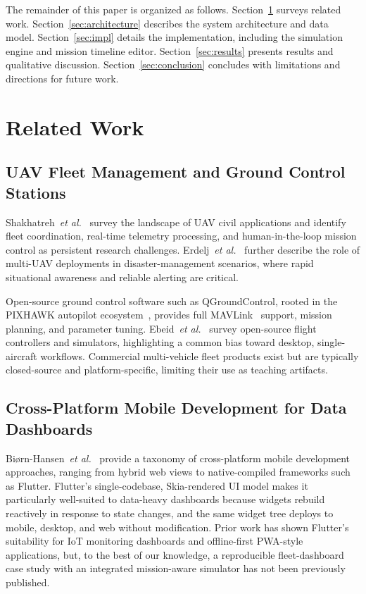 \documentclass[conference]{IEEEtran}
\begin{document}
The remainder of this paper is organized as follows. Section~\ref{sec:related} surveys related work. Section~\ref{sec:architecture} describes the system architecture and data model. Section~\ref{sec:impl} details the implementation, including the simulation engine and mission timeline editor. Section~\ref{sec:results} presents results and qualitative discussion. Section~\ref{sec:conclusion} concludes with limitations and directions for future work.

\section{Related Work}
\label{sec:related}

\subsection{UAV Fleet Management and Ground Control Stations}

Shakhatreh~\emph{et al.}~\cite{shakhatreh2019uav} survey the landscape of UAV civil applications and identify fleet coordination, real-time telemetry processing, and human-in-the-loop mission control as persistent research challenges. Erdelj~\emph{et al.}~\cite{erdelj2017help} further describe the role of multi-UAV deployments in disaster-management scenarios, where rapid situational awareness and reliable alerting are critical.

Open-source ground control software such as QGroundControl, rooted in the PIXHAWK autopilot ecosystem~\cite{meier2011pixhawk}, provides full MAVLink~\cite{koubaa2019mavlink} support, mission planning, and parameter tuning. Ebeid~\emph{et al.}~\cite{ebeid2018survey} survey open-source flight controllers and simulators, highlighting a common bias toward desktop, single-aircraft workflows. Commercial multi-vehicle fleet products exist but are typically closed-source and platform-specific, limiting their use as teaching artifacts.

\subsection{Cross-Platform Mobile Development for Data Dashboards}

Biørn-Hansen~\emph{et al.}~\cite{biorn2019cross} provide a taxonomy of cross-platform mobile development approaches, ranging from hybrid web views to native-compiled frameworks such as Flutter. Flutter's single-codebase, Skia-rendered UI model makes it particularly well-suited to data-heavy dashboards because widgets rebuild reactively in response to state changes, and the same widget tree deploys to mobile, desktop, and web without modification. Prior work has shown Flutter's suitability for IoT monitoring dashboards and offline-first PWA-style applications, but, to the best of our knowledge, a reproducible fleet-dashboard case study with an integrated mission-aware simulator has not been previously published.
\end{document}
